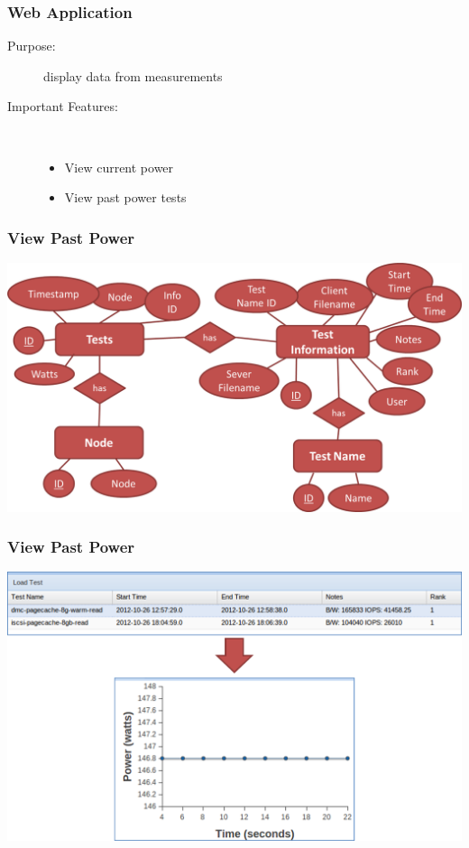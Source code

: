 \documentclass{beamer}
\begin{document}
\begin{frame}
  \frametitle{Web Application}

  \begin{description}
    \item[Purpose:] display data from measurements
    \item[Important Features:] \hfill \\
    \begin{itemize}
      \item View current power
      \item View past power tests
    \end{itemize}
  \end{description}

\end{frame}

\begin{frame}
  \frametitle{View Past Power}

  \includegraphics[width=\textwidth,keepaspectratio]{db-diagram.png}

\end{frame}

\begin{frame}
  \frametitle{View Past Power}

  \includegraphics[width=\textwidth,keepaspectratio]{test-to-graph.png}

\end{frame}
\end{document}
